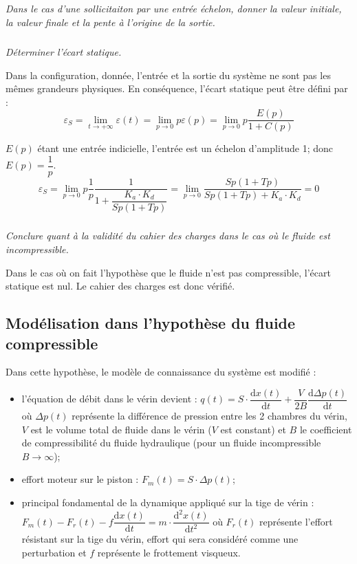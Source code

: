 \documentclass[10pt,fleqn]{article} %
\begin{document}
\begin{multicols}{2}
\subparagraph{}
\textit{Dans le cas d'une sollicitaiton par une entrée échelon, donner la valeur initiale, la valeur finale et la pente à l'origine de la sortie.}
\ifprof
\begin{corrige}
\end{corrige}
\else \fi

\subparagraph{}
\textit{Déterminer l'écart statique.}
\ifprof
\begin{corrige}
Dans la configuration, donnée, l'entrée et la sortie du système ne sont pas les mêmes grandeurs physiques. En conséquence, l'écart statique peut être défini par : 
$$
\varepsilon_S 
= \lim\limits_{t\to+\infty} \varepsilon(t)
= \lim\limits_{p\to 0} p\varepsilon(p)
= \lim\limits_{p\to 0} p\dfrac{E(p)}{1+C(p)}
$$

$E(p)$ étant une entrée indicielle, l'entrée est un échelon d'amplitude 1; donc $E(p)=\dfrac{1}{p}$.
$$
\varepsilon_S 
= \lim\limits_{p\to 0} p\dfrac{1}{p}\dfrac{1}{1+\dfrac{K_a\cdot K_d }{Sp\left( 1+Tp\right)}}
= \lim\limits_{p\to 0} \dfrac{Sp\left( 1+Tp\right)}{Sp\left( 1+Tp\right)+K_a\cdot K_d}
= 0
$$
\end{corrige}
\else \fi

\subparagraph{}
\textit{Conclure quant à la validité du cahier des charges dans le cas où le fluide est incompressible.}
\ifprof
\begin{corrige}
Dans le cas où on fait l'hypothèse que le fluide n'est pas compressible, l'écart statique est nul. Le cahier des charges est donc vérifié.
\end{corrige}
\else \fi


\subsection*{Modélisation dans l'hypothèse du fluide compressible}
Dans cette hypothèse, le modèle de connaissance du système est modifié : 
\begin{itemize}
\item l'équation de débit dans le vérin devient : $q(t)=S\cdot\dfrac{\text{d}x(t)}{\text{d}t}+\dfrac{V}{2B}\dfrac{\text{d}\Delta p(t)}{\text{d}t}$ où $\Delta p(t)$ représente la différence de pression entre les 2 chambres du vérin, $V$ est le volume total de fluide dans le vérin ($V$ est constant) et $B$ le coefficient de compressibilité du fluide hydraulique (pour un fluide incompressible $B\rightarrow \infty$);
\item effort moteur sur le piston : $F_m(t)=S\cdot \Delta p(t)$;
\item principal fondamental de la dynamique appliqué sur la tige de vérin :
$F_m(t)-F_r(t)-f\dfrac{\text{d}x(t)}{\text{d}t}=m\cdot\dfrac{\text{d}^2x(t)}{\text{d}t^2}$ où $F_r(t)$ représente l'effort résistant sur la tige du vérin, effort qui sera considéré comme une perturbation et $f$ représente le frottement visqueux.
\end{itemize}


\end{multicols}
\end{document}
